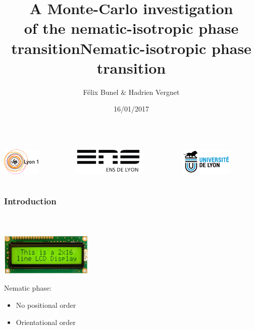 \documentclass{beamer}
\title{A Monte-Carlo investigation\\ of the nematic-isotropic phase transition}
\author{Félix Bunel \& Hadrien Vergnet}
\date{16/01/2017}
\begin{document}

\begin{frame}[plain]

\begin{columns}
\begin{column}{3.3cm}
\center
   \includegraphics[height=1.3cm]{figures/logo_lyon1.jpg}
\end{column}
\begin{column}{3.3cm}
\center
\includegraphics[height=1.3cm]{figures/logo_ens.jpg}
\end{column}
\begin{column}{3.3cm}
	\center
\includegraphics[height=1.3cm]{figures/logo_univ_lyon.jpg}
\end{column}
\end{columns}

\titlepage
\end{frame}

\title{Nematic-isotropic phase transition}
\begin{frame}
\frametitle{Introduction}
\framesubtitle{\ }

\begin{center}
\includegraphics[height = 2cm]{figures/lcd.jpg}
\end{center} 

Nematic phase:
\begin{itemize}
\item No positional order
\item Orientational order
\end{itemize}
\vspace{-0.5cm}
\center 

\end{frame}
\end{document}
